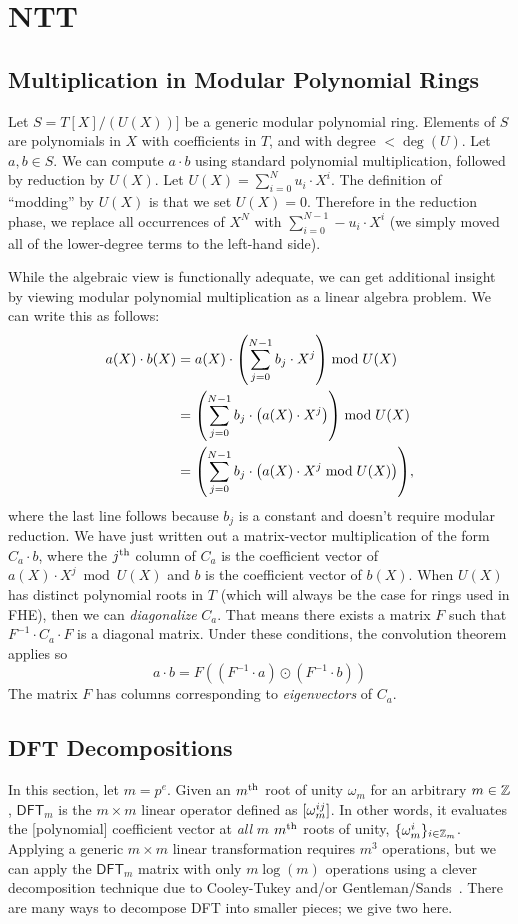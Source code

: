\documentclass[../fheimpl.tex]{subfiles}
\begin{document}
\section{NTT}
\subsection{Multiplication in Modular Polynomial Rings}
Let $S=T[X]/(U(X))]$ be a generic modular polynomial ring. Elements of $S$ are polynomials in $X$ with coefficients in $T$, and with degree $<\deg(U)$. Let $a,b\in S$. We can compute $a\cdot b$ using standard polynomial multiplication, followed by reduction by $U(X)$. Let $U(X)=\sum_{i=0}^N u_i\cdot X^i$. The definition of ``modding'' by $U(X)$ is that we set $U(X)=0$. Therefore in the reduction phase, we replace all occurrences of $X^N$ with $\sum_{i=0}^{N-1}-u_i\cdot X^i$ (we simply moved all of the lower-degree terms to the left-hand side). 

While the algebraic view is functionally adequate, we can get additional insight by viewing modular polynomial multiplication as a linear algebra problem. We can write this as follows:
\begin{align}
	a(X)\cdot b(X) &= a(X)\cdot \parens*{\sum_{j=0}^{N-1} b_j\cdot X^j} \bmod U(X) \\
	&= \parens*{\sum_{j=0}^{N-1} b_j\cdot \parens*{a(X)\cdot X^j}} \bmod U(X) \\
	&= \parens*{\sum_{j=0}^{N-1} b_j\cdot \parens*{a(X)\cdot X^j  \bmod U(X)}},
\end{align}
where the last line follows because $b_j$ is a constant and doesn't require modular reduction. We have just written out a matrix-vector multiplication of the form $C_a\cdot b$, where the $j^{\mathrm{th}}$ column of $C_a$ is the coefficient vector of $a(X)\cdot X^j  \bmod U(X)$ and $b$ is the coefficient vector of $b(X)$. When $U(X)$ has distinct polynomial roots in $T$ (which will always be the case for rings used in FHE), then we can \emph{diagonalize} $C_a$. That means there exists a matrix $F$ such that $F^{-1}\cdot C_a\cdot F$ is a diagonal matrix. Under these conditions, the convolution theorem applies so
\[a\cdot b = F((F^{-1}\cdot a)\odot (F^{-1}\cdot b))\]
The matrix $F$ has columns corresponding to \emph{eigenvectors} of $C_a$. 

\subsection{DFT Decompositions}
In this section, let $m=p^e$. Given an $m^{\mathrm{th}}$ root of unity $\omega_m$ for an arbitrary $m\in\mathbb{Z}$, $\mathsf{DFT}_m$ is the $m\times m$ linear operator defined as $[\omega_m^{ij}]$. In other words, it evaluates the [polynomial] coefficient vector at \emph{all} $m$ $m^{\mathrm{th}}$ roots of unity, $\{\omega_m^i\}_{i\in\mathbb{Z}_m}$. Applying a generic $m\times m$ linear transformation requires $m^3$ operations, but we can apply the $\mathsf{DFT}_m$ matrix with only $m\log(m)$ operations using a clever decomposition technique due to Cooley-Tukey and/or Gentleman/Sands~\cite{cryptoeprint:2024/585}. There are many ways to decompose DFT into smaller pieces; we give two here.
\end{document}
